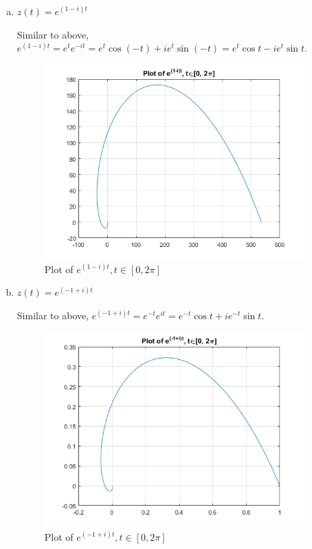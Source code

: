 \documentclass{article}
\begin{document}
\begin{itemize}
\begin{enumerate}[(a)]
			\item $z(t)=e^{(1-i)t}$ 
				\begin{answer*}
					Similar to above, $e^{(1-i)t} = e^t e^{-it} = e^t \cos (-t) + i e^t\sin (-t)=e^t \cos t - ie^t\sin t.$
					\begin{figure}[h!]
						\centering
						\includegraphics[width=10cm]{18b.png}
						\caption{Plot of $e^{(1-i)t}, t\in[0, 2\pi]$}
					\end{figure}
				\end{answer*}
				\newpage

			\item $z(t)=e^{(-1+i)t}$
				\begin{answer*}
					Similar to above, $e^{(-1+i)t} = e^{-t} e^{it} = e^{-t} \cos t + i e^{-t}\sin t.$
					\begin{figure}[h!]
						\centering
						\includegraphics[width=10cm]{18c.png}
						\caption{Plot of $e^{(-1+i)t}, t\in[0, 2\pi]$}
					\end{figure}
				\end{answer*}


\end{enumerate}
\end{itemize}
\end{document}
